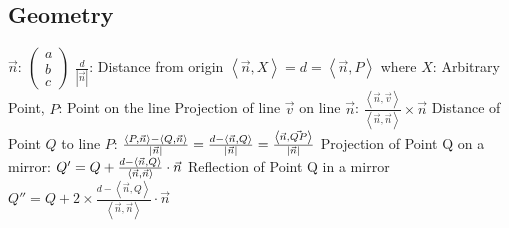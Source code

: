\documentclass[12pt]{article}
\begin{document}
\subsection{Geometry}
\begin{math}
\vec{n}:\ \left ( \begin{matrix} a\\ b\\ c\end{matrix} \right )
\end{math}\newline\newline\newline
\begin{math}\frac{d}{\left |\vec{n}  \right |}\end{math}: Distance from origin\newline\newline
\begin{math}\left \langle \vec{n},X \right \rangle = d = \left \langle \vec{n},P \right \rangle\end{math} where $X$: Arbitrary Point, $P$: Point on the line\newline\newline
Projection of line $\vec{v}$ on line $\vec{n}$: \begin{math}\frac{\left \langle \vec{n}, \vec{v} \right \rangle}{\left \langle \vec{n},\vec{n} \right \rangle}\times \vec{n}\end{math}\newline\newline
Distance of Point $Q$ to line $P$:\newline
\begin{math}
\frac{\left \langle P,\vec{n} \right \rangle - \left \langle Q,\vec{n} \right \rangle}{\left | \vec{n} \right |}=\frac{d-\left \langle \vec{n}, Q \right \rangle}{\left | \vec{n} \right |}=
\frac{\left \langle \vec{n}, \vec{QP} \right \rangle}{\left | \vec{n} \right |}\newline\newline
\end{math}
Projection of Point Q on a mirror:\newline\newline
\begin{math}
Q'=Q+\frac{d-\left \langle \vec{n},Q \right \rangle}{\left \langle \vec{n},\vec{n} \right \rangle}\cdot \vec{n}\newline\newline
\end{math}\newline\newline
Reflection of Point Q in a mirror\newline\newline
\begin{math}
Q''= Q+2\times\frac{d-\left \langle \vec{n},Q \right \rangle}{\left \langle \vec{n},\vec{n} \right \rangle}\cdot \vec{n}
\end{math}\newpage
\end{document}
